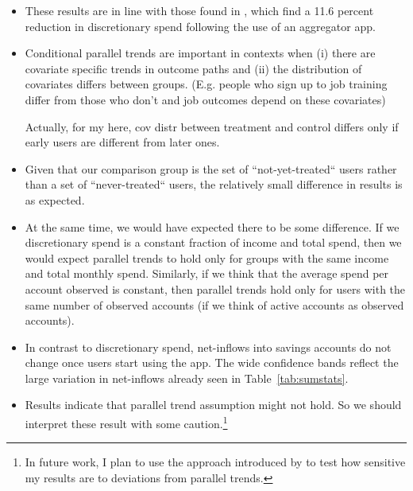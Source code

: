 \begin{itemize}
    \item These results are in line with those found in \citet{levi2020mind},
        which find a 11.6 percent reduction in discretionary spend following
        the use of an aggregator app.

    \item Conditional parallel trends are important in contexts when (i) there
        are covariate specific trends in outcome paths and (ii) the
        distribution of covariates differs between groups. (E.g. people who
        sign up to job training differ from those who don't and job outcomes
        depend on these covariates)

        Actually, for my here, cov distr between treatment and control differs
        only if early users are different from later ones.

    \item  Given that our comparison group is the set of
        ``not-yet-treated`` users rather than a set of ``never-treated`` users,
        the relatively small difference in results is as expected.

    \item At the same time, we would have expected there to be some difference.
        If we discretionary spend is a constant fraction of income and total
        spend, then we would expect parallel trends to hold only for groups
        with the same income and total monthly spend. Similarly, if we think
        that the average spend per account observed is constant, then parallel
        trends hold only for users with the same number of observed accounts
        (if we think of active accounts as observed accounts).

    \item In contrast to discretionary spend, net-inflows into savings accounts
        do not change once users start using the app. The wide confidence
        bands reflect the large variation in net-inflows already seen in
        Table~\ref{tab:sumstats}.

    \item Results indicate that parallel trend assumption might not hold. So we
        should interpret these result with some
        caution.\footnote{In future work, I plan to use the approach introduced
            by \citet{rambachan2022more} to test how sensitive my results are
        to deviations from parallel trends.}


\end{itemize}


